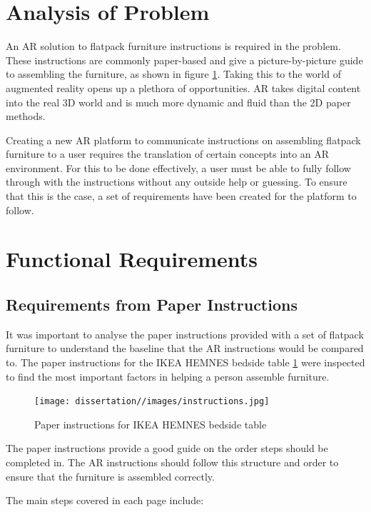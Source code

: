 \documentclass{l4proj}
\begin{document}
\section{Analysis of Problem}

An AR solution to flatpack furniture instructions is required in the problem. These instructions are commonly paper-based and give a picture-by-picture guide to assembling the furniture, as shown in figure \ref{fig:instructions}. Taking this to the world of augmented reality opens up a plethora of opportunities. AR takes digital content into the real 3D world and is much more dynamic and fluid than the 2D paper methods.

Creating a new AR platform to communicate instructions on assembling flatpack furniture to a user requires the translation of certain concepts into an AR environment. For this to be done effectively, a user must be able to fully follow through with the instructions without any outside help or guessing. To ensure that this is the case, a set of requirements have been created for the platform to follow.

\section{Functional Requirements}

\subsection{Requirements from Paper Instructions}

It was important to analyse the paper instructions provided with a set of flatpack furniture to understand the baseline that the AR instructions would be compared to. The paper instructions for the IKEA HEMNES bedside table \ref{fig:instructions} were inspected to find the most important factors in helping a person assemble furniture.

\begin{figure}[hbt!]
    \centering
    \texttt{[image: dissertation//images/instructions.jpg]}
    \caption{Paper instructions for IKEA HEMNES bedside table \cite{noauthor_hemnes_nodate}}
    \label{fig:instructions}
\end{figure}

The paper instructions provide a good guide on the order steps should be completed in. The AR instructions should follow this structure and order to ensure that the furniture is assembled correctly.

The main steps covered in each page include:
\end{document}
